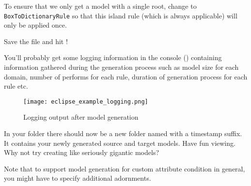 \begin{stepbystep}

\item  To ensure that we only get a model with a single root, change  to \texttt{BoxToDictionaryRule} so that this island rule (which is always applicable) will only be applied once.

\item Save the file and hit !

You'll probably get some logging information in the console () containing information gathered during the generation process such as model size for each domain, number of performs for each rule, duration of generation process for each rule etc.

\end{stepbystep}


\begin{figure}[htbp]
\renewcommand\figurename{Figure} 
\begin{center}
\texttt{[image: eclipse\_example\_logging.png]}
\caption{Logging output after model generation}
\label{eclipse:modelgen_log}
\end{center}
\end{figure}

In your  folder there should now be a new folder named  with a timestamp suffix. 
It contains your newly generated source and target models.
Have fun viewing.
Why not try creating like seriously gigantic models?

Note that to support model generation for custom attribute condition in general, you might have to specify additional  adornments.

